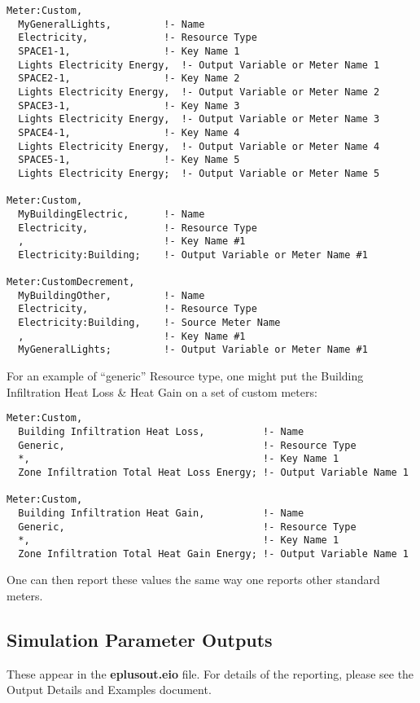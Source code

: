 \begin{lstlisting}
Meter:Custom,
  MyGeneralLights,         !- Name
  Electricity,             !- Resource Type
  SPACE1-1,                !- Key Name 1
  Lights Electricity Energy,  !- Output Variable or Meter Name 1
  SPACE2-1,                !- Key Name 2
  Lights Electricity Energy,  !- Output Variable or Meter Name 2
  SPACE3-1,                !- Key Name 3
  Lights Electricity Energy,  !- Output Variable or Meter Name 3
  SPACE4-1,                !- Key Name 4
  Lights Electricity Energy,  !- Output Variable or Meter Name 4
  SPACE5-1,                !- Key Name 5
  Lights Electricity Energy;  !- Output Variable or Meter Name 5

Meter:Custom,
  MyBuildingElectric,      !- Name
  Electricity,             !- Resource Type
  ,                        !- Key Name #1
  Electricity:Building;    !- Output Variable or Meter Name #1

Meter:CustomDecrement,
  MyBuildingOther,         !- Name
  Electricity,             !- Resource Type
  Electricity:Building,    !- Source Meter Name
  ,                        !- Key Name #1
  MyGeneralLights;         !- Output Variable or Meter Name #1
\end{lstlisting}

For an example of ``generic'' Resource type, one might put the Building Infiltration Heat Loss \& Heat Gain on a set of custom meters:

\begin{lstlisting}
Meter:Custom,
  Building Infiltration Heat Loss,          !- Name
  Generic,                                  !- Resource Type
  *,                                        !- Key Name 1
  Zone Infiltration Total Heat Loss Energy; !- Output Variable Name 1

Meter:Custom,
  Building Infiltration Heat Gain,          !- Name
  Generic,                                  !- Resource Type
  *,                                        !- Key Name 1
  Zone Infiltration Total Heat Gain Energy; !- Output Variable Name 1
\end{lstlisting}

One can then report these values the same way one reports other standard meters.

\subsection{Simulation Parameter Outputs}\label{simulation-parameter-outputs}

These appear in the \textbf{eplusout.eio} file. For details of the reporting, please see the Output Details and Examples document.
